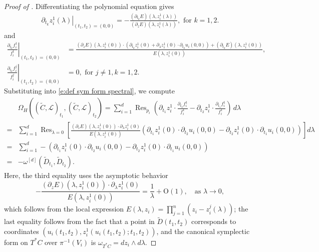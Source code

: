 \documentclass[twoside, 11pt]{article}
\numberwithin{equation}{section}
\theoremstyle{theorem}
\numberwithin{theorem}{section}
\theoremstyle{definition}
\begin{document}
\begin{proof}[Proof of ]
Differentiating the polynomial equation gives
\begin{align*}
    \left. \partial_{t_k} z_i^1(\lambda)  \right|_{(t_1,t_2)=(0,0)}
    = - \frac{\left( \partial_{t_k} E \right) (\lambda, z_i^1(\lambda))}{\left( \partial_z E \right) (\lambda, z_i^1(\lambda))} , \text{ for } k=1,2.
\end{align*}
and
\begin{align*}
    \left. \frac{\partial_{t_k} f_i^1}{f_i^1} \right|_{(t_1,t_2)=(0,0)} 
    & = \frac{
        \left( \partial_z E \right)(\lambda, z_i^1(0)) \cdot \left( \partial_{t_k} z_i^1(0) + \partial_\lambda z_i^1(0) \cdot \partial_{t_k} u_i(0,0) \right) + \left( \partial_{t_k} E \right)(\lambda, z_i^1(0))
    }{
        E(\lambda, z_i^1(0))
    }, \\
\left. \frac{\partial_{t_k} f_i^j}{f_i^j} \right|_{(t_1,t_2)=(0,0)} &= 0, \text{ for } j \neq 1, k=1,2.
\end{align*}
Substituting into \eqref{e:def sym form spectral}, we compute
\begin{align*}
&\Omega_H \left( (\widetilde{C},\mathcal{L})_{t_1}, ( \widetilde{C},\mathcal{L})_{t_2}\right)
= \sum_{i=1}^d \operatorname{Res}_{p_i} \left(
    \partial_{t_1} z_i^1 \cdot \frac{\partial_{t_2} f_i^1}{f_i^1}
    - \partial_{t_2} z_i^1 \cdot \frac{\partial_{t_1} f_i^1}{f_i^1}
\right) \, d\lambda \\
=& \sum_{i=1}^d \operatorname{Res}_{\lambda = 0} 
\left[
    \frac{\left( \partial_z E \right)(\lambda, z_i^1(0)) \cdot \partial_\lambda z_i^1(0)}{E(\lambda, z_i^1(0))}
    \left(
        \partial_{t_1} z_i^1(0) \cdot \partial_{t_2} u_i(0,0)
        - \partial_{t_2} z_i^1(0) \cdot \partial_{t_1} u_i(0,0)
    \right)
\right] d\lambda \\
=& \sum_{i=1}^d -\left(
    \partial_{t_1} z_i^1(0) \cdot \partial_{t_2} u_i(0,0)
    - \partial_{t_2} z_i^1(0) \cdot \partial_{t_1} u_i(0,0)
\right) \\
=& -\omega^{[d]} \left( \widetilde{D}_{t_1}, \widetilde{D}_{t_2} \right).
\end{align*}
Here, the third equality uses the asymptotic behavior
\[
- \frac{(\partial_z E)(\lambda, z_i^1(0)) \cdot \partial_\lambda z_i^1(0)}{E(\lambda, z_i^1(0))} = \frac{1}{\lambda}+\mathrm{O}(1),
\quad \text{as } \lambda \to 0,
\]
which follows from the local expression \( E(\lambda, z_i) = \prod_{j=1}^n (z_i - z_i^j(\lambda)) \); the last equality follows from the fact that a point in $\widetilde{D}(t_1, t_2)$ corresponds to coordinates $(u_i(t_1,t_2), z_i^1(u_i(t_1,t_2); t_1, t_2))$, and the canonical symplectic form on $T^*C$ over $\pi^{-1}(V_i)$ is $\omega_{T^\ast C} = dz_i \wedge d\lambda$.
\end{proof}
\end{document}
